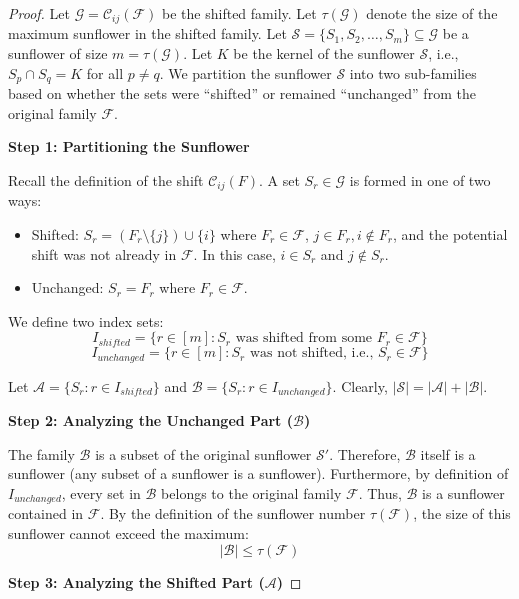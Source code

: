 \documentclass[runningheads,12pt,a4paper]{article}
\begin{document}
\begin{proof}
	Let $\mathcal{G} = \mathcal{C}_{ij}(\mathcal{F})$ be the shifted family. Let $\tau(\mathcal{G})$ denote the size of the maximum sunflower in the shifted family. Let $\mathcal{S} = \{S_1, S_2, \dots, S_m\} \subseteq \mathcal{G} $ be a sunflower of size $m = \tau(\mathcal{G} )$. Let $K$ be the kernel of the sunflower $\mathcal{S}$, i.e., $S_p \cap S_q = K$ for all $p \neq q$.
	We partition the sunflower $\mathcal{S}$ into two sub-families based on whether the sets were ``shifted'' or remained ``unchanged'' from the original family $\mathcal{F}$.
	
	{\noindent \bf Step 1: Partitioning the Sunflower}
	
	Recall the definition of the shift $\mathcal{C}_{ij}(F)$. A set $S_r \in \mathcal{G} $ is formed in one of two ways:
	\begin{itemize}
		\item Shifted: $S_r = (F_r \setminus \{j\}) \cup \{i\}$ where $F_r \in \mathcal{F}$, $j \in F_r, i \notin F_r$, and the potential shift was not already in $\mathcal{F}$. In this case, $i \in S_r$ and $j \notin S_r$.
		\item Unchanged: $S_r = F_r$ where $F_r \in \mathcal{F}$.
	\end{itemize}
	
	We define two index sets:$$I_{shifted} = \{ r \in [m] : S_r \text{ was shifted from some } F_r \in \mathcal{F} \}$$$$I_{unchanged} = \{ r \in [m] : S_r \text{ was not shifted, i.e., } S_r \in \mathcal{F} \}$$
	
	Let $\mathcal{A} = \{ S_r : r \in I_{shifted} \}$ and $\mathcal{B} = \{ S_r : r \in I_{unchanged} \}$.
	Clearly, $|\mathcal{S}| = |\mathcal{A}| + |\mathcal{B}|$.
	
	{\noindent \bf Step 2: Analyzing the Unchanged Part ($\mathcal{B}$)}
	
	The family $\mathcal{B}$ is a subset of the original sunflower $\mathcal{S}'$. Therefore, $\mathcal{B}$ itself is a sunflower (any subset of a sunflower is a sunflower). Furthermore, by definition of $I_{unchanged}$, every set in $\mathcal{B}$ belongs to the original family $\mathcal{F}$. Thus, $\mathcal{B}$ is a sunflower contained in $\mathcal{F}$. By the definition of the sunflower number $\tau(\mathcal{F})$, the size of this sunflower cannot exceed the maximum:$$|\mathcal{B}| \leq \tau(\mathcal{F})$$
	
	{\noindent \bf  Step 3: Analyzing the Shifted Part ($\mathcal{A}$)} 
	

\end{proof}
\end{document}
